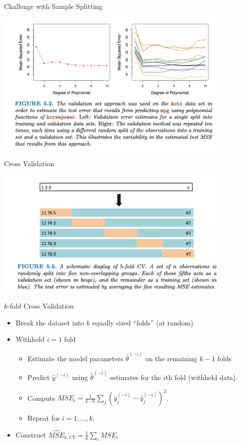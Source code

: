 \documentclass[11pt,handout,xcolor=pdftex,dvipsnames,table,mathserif,aspectratio=169]{beamer}
\begin{document}
\begin{frame}{Challenge with Sample Splitting}
\begin{center}
\includegraphics[width=4.5in]{./resources/validation-10fold}
\end{center}
\end{frame}


\begin{frame}{Cross Validation}
\begin{center}
\includegraphics[width=4.5in]{./resources/split-cv5}
\end{center}
\end{frame}

\begin{frame}{$k$-fold Cross Validation}
\begin{itemize}
\item Break the dataset into $k$ equally sized ``folds'' (at random).
\item Withhold $i=1$ fold
\begin{itemize}
\item Estimate the model parameters $\hat{\theta}^{(-i)}$ on the remaining $k-1$ folds
\item Predict $\hat{y}^{(-i)}$ using $\hat{\theta}^{(-i)}$ estimates for the $i$th fold (withheld data).
\item Compute $MSE_i =\frac{1}{k \cdot N} \sum_j (y^{(-i)}_j -\hat{y}^{(-i)}_j)^2$.
\item Repeat for $i=1,\ldots,k$.
\end{itemize}
\item Construct $\widehat{MSE}_{k,CV} = \frac{1}{k} \sum_i MSE_{i}$
\end{itemize}
\end{frame}
\end{document}
